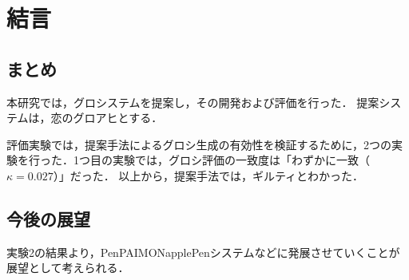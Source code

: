\documentclass[main]{subfiles}
\begin{document}
\chapter{結言}
\section{まとめ}
本研究では，グロシステムを提案し，その開発および評価を行った．
提案システムは，恋のグロアヒとする．

評価実験では，提案手法によるグロシ生成の有効性を検証するために，2つの実験を行った．1つ目の実験では，グロシ評価の一致度は「わずかに一致（\(\kappa = 0.027\)）」だった．
以上から，提案手法では，ギルティとわかった．

\section{今後の展望}
実験2の結果より，PenPAIMONapplePenシステムなどに発展させていくことが展望として考えられる．
\end{document}
